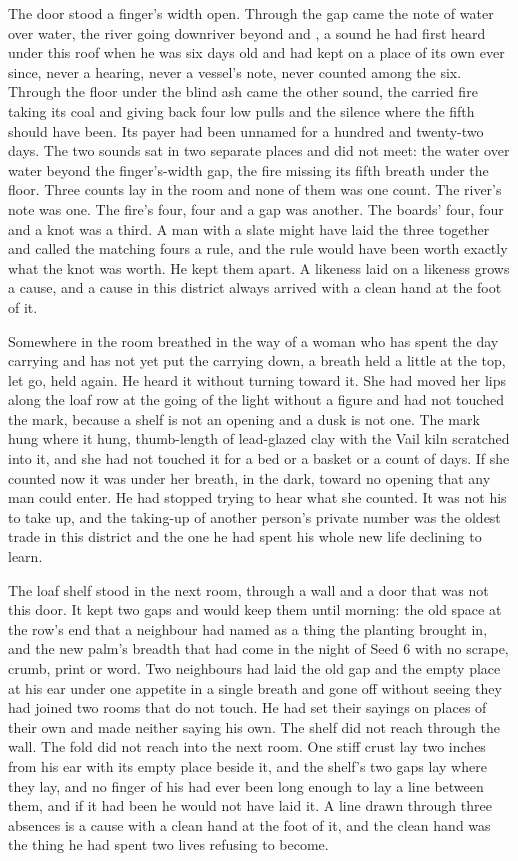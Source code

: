 The door stood a finger's width open. Through the gap came the note of water over water, the river going downriver beyond  and , a sound he had first heard under this roof when he was six days old and had kept on a place of its own ever since, never a hearing, never a vessel's note, never counted among the six. Through the floor under the blind ash came the other sound, the carried fire taking its coal and giving back four low pulls and the silence where the fifth should have been. Its payer had been unnamed for a hundred and twenty-two days. The two sounds sat in two separate places and did not meet: the water over water beyond the finger's-width gap, the fire missing its fifth breath under the floor. Three counts lay in the room and none of them was one count. The river's note was one. The fire's four, four and a gap was another. The boards' four, four and a knot was a third. A man with a slate might have laid the three together and called the matching fours a rule, and the rule would have been worth exactly what the knot was worth. He kept them apart. A likeness laid on a likeness grows a cause, and a cause in this district always arrived with a clean hand at the foot of it.

Somewhere in the room  breathed in the way of a woman who has spent the day carrying and has not yet put the carrying down, a breath held a little at the top, let go, held again. He heard it without turning toward it. She had moved her lips along the loaf row at the going of the light without a figure and had not touched the mark, because a shelf is not an opening and a dusk is not one. The mark hung where it hung, thumb-length of lead-glazed clay with the Vail kiln scratched into it, and she had not touched it for a bed or a basket or a count of days. If she counted now it was under her breath, in the dark, toward no opening that any man could enter. He had stopped trying to hear what she counted. It was not his to take up, and the taking-up of another person's private number was the oldest trade in this district and the one he had spent his whole new life declining to learn.

The loaf shelf stood in the next room, through a wall and a door that was not this door. It kept two gaps and would keep them until morning: the old space at the row's end that a neighbour had named as a thing the planting brought in, and the new palm's breadth that had come in the night of Seed 6 with no scrape, crumb, print or word. Two neighbours had laid the old gap and the empty place at his ear under one appetite in a single breath and gone off without seeing they had joined two rooms that do not touch. He had set their sayings on places of their own and made neither saying his own. The shelf did not reach through the wall. The fold did not reach into the next room. One stiff crust lay two inches from his ear with its empty place beside it, and the shelf's two gaps lay where they lay, and no finger of his had ever been long enough to lay a line between them, and if it had been he would not have laid it. A line drawn through three absences is a cause with a clean hand at the foot of it, and the clean hand was the thing he had spent two lives refusing to become.

